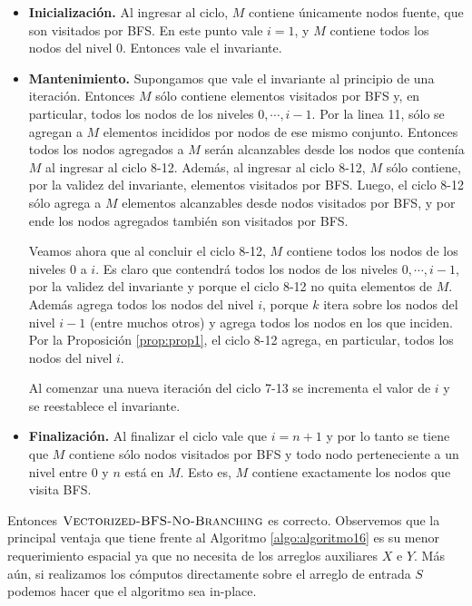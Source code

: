 \begin{itemize}
\item \textbf{Inicialización. } Al ingresar al ciclo, $M$ contiene únicamente nodos fuente, que son visitados por BFS. En este punto vale $i = 1$, y $M$ contiene todos los nodos del nivel 0. Entonces vale el invariante.

\item \textbf{Mantenimiento. } Supongamos que vale el invariante al principio de una iteración. Entonces $M$ sólo contiene elementos visitados por BFS y, en particular, todos los nodos de los niveles $0, \cdots, i - 1$. Por la linea 11, sólo se agregan a $M$ elementos incididos por nodos de ese mismo conjunto. Entonces todos los nodos agregados a $M$ serán alcanzables desde los nodos que contenía $M$ al ingresar al ciclo 8-12. Además, al ingresar al ciclo 8-12, $M$ sólo contiene, por la validez del invariante, elementos visitados por BFS. Luego, el ciclo 8-12 sólo agrega a $M$ elementos alcanzables desde nodos visitados por BFS, y por ende los nodos agregados también son visitados por BFS.

Veamos ahora que al concluir el ciclo 8-12, $M$ contiene todos los nodos de los niveles 0 a $i$. Es claro que contendrá todos los nodos de los niveles $0, \cdots, i - 1$, por la validez del invariante y porque el ciclo 8-12 no quita elementos de $M$. Además agrega todos los nodos del nivel $i$, porque $k$ itera sobre los nodos del nivel $i - 1$ (entre muchos otros) y agrega todos los nodos en los que inciden. Por la Proposición \ref{prop:prop1}, el ciclo 8-12 agrega, en particular, todos los nodos del nivel $i$.

Al comenzar una nueva iteración del ciclo 7-13 se incrementa el valor de $i$ y se reestablece el invariante. 

\item \textbf{Finalización. } Al finalizar el ciclo vale que $i = n + 1$ y por lo tanto se tiene que $M$ contiene sólo nodos visitados por BFS y todo nodo perteneciente a un nivel entre 0 y $n$ está en $M$. Esto es, $M$ contiene exactamente los nodos que visita BFS.
\end{itemize}

Entonces $\textsc{Vectorized-BFS-No-Branching}$ es correcto. Observemos que la principal ventaja que tiene frente al Algoritmo \ref{algo:algoritmo16} es su menor requerimiento espacial ya que no necesita de los arreglos auxiliares $X$ e $Y$. Más aún, si realizamos los cómputos directamente sobre el arreglo de entrada $S$ podemos hacer que el algoritmo sea in-place.


